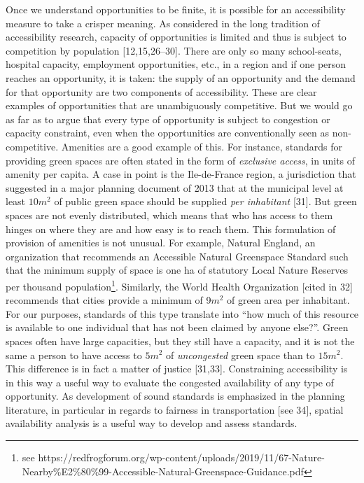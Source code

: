 \documentclass[10pt,letterpaper]{article}
\begin{document}
Once we understand opportunities to be finite, it is possible for an
accessibility measure to take a crisper meaning. As considered in the
long tradition of accessibility research, capacity of opportunities is
limited and thus is subject to competition by population
{[}12,15,26--30{]}. There are only so many school-seats, hospital
capacity, employment opportunities, etc., in a region and if one person
reaches an opportunity, it is taken: the supply of an opportunity and
the demand for that opportunity are two components of accessibility.
These are clear examples of opportunities that are unambiguously
competitive. But we would go as far as to argue that every type of
opportunity is subject to congestion or capacity constraint, even when
the opportunities are conventionally seen as non-competitive. Amenities
are a good example of this. For instance, standards for providing green
spaces are often stated in the form of \emph{exclusive access}, in units
of amenity per capita. A case in point is the Ile-de-France region, a
jurisdiction that suggested in a major planning document of 2013 that at
the municipal level at least \(10m^2\) of public green space should be
supplied \emph{per inhabitant} {[}31{]}. But green spaces are not evenly
distributed, which means that who has access to them hinges on where
they are and how easy is to reach them. This formulation of provision of
amenities is not unusual. For example, Natural England, an organization
that recommends an Accessible Natural Greenspace Standard such that the
minimum supply of space is one ha of statutory Local Nature Reserves per
thousand population\footnote{see
  https://redfrogforum.org/wp-content/uploads/2019/11/67-Nature-Nearby\%E2\%80\%99-Accessible-Natural-Greenspace-Guidance.pdf}.
Similarly, the World Health Organization {[}cited in 32{]} recommends
that cities provide a minimum of 9\(m^2\) of green area per inhabitant.
For our purposes, standards of this type translate into ``how much of
this resource is available to one individual that has not been claimed
by anyone else?''. Green spaces often have large capacities, but they
still have a capacity, and it is not the same a person to have access to
\(5m^2\) of \emph{uncongested} green space than to \(15m^2\). This
difference is in fact a matter of justice {[}31,33{]}. Constraining
accessibility is in this way a useful way to evaluate the congested
availability of any type of opportunity. As development of sound
standards is emphasized in the planning literature, in particular in
regards to fairness in transportation {[}see 34{]}, spatial availability
analysis is a useful way to develop and assess standards.
\end{document}
